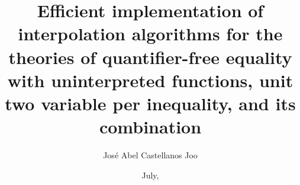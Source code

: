 \documentclass[botnum, fleqn, 12]{unmeethesis}
\begin{document}
\frontmatter



\title{Efficient implementation of interpolation algorithms
for the theories of quantifier-free equality with uninterpreted functions, unit two variable per inequality, and its combination}

\author{Jos\'e Abel Castellanos Joo}





\date{July, \thisyear}

\maketitle




\maketitleabstract %



\tableofcontents
\listoffigures
\listoftables



\mainmatter












\end{document}
